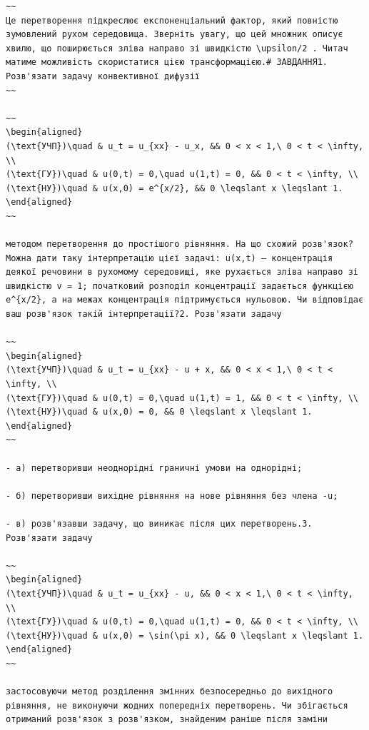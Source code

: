 \documentclass[
  ukrainian,
]{article}
\begin{document}
\begin{verbatim}
~~
Це перетворення підкреслює експоненціальний фактор, який повністю зумовлений рухом середовища. Зверніть увагу, що цей множник описує хвилю, що поширюється зліва направо зі швидкістю \upsilon/2 . Читач матиме можливість скористатися цією трансформацією.# ЗАВДАННЯ1. Розв'язати задачу конвективної дифузії
~~

~~
\begin{aligned}
(\text{УЧП})\quad & u_t = u_{xx} - u_x, && 0 < x < 1,\ 0 < t < \infty, \\
(\text{ГУ})\quad & u(0,t) = 0,\quad u(1,t) = 0, && 0 < t < \infty, \\
(\text{НУ})\quad & u(x,0) = e^{x/2}, && 0 \leqslant x \leqslant 1.
\end{aligned}
~~

методом перетворення до простішого рівняння. На що схожий розв'язок? Можна дати таку інтерпретацію цієї задачі: u(x,t) — концентрація деякої речовини в рухомому середовищі, яке рухається зліва направо зі швидкістю v = 1; початковий розподіл концентрації задається функцією e^{x/2}, а на межах концентрація підтримується нульовою. Чи відповідає ваш розв'язок такій інтерпретації?2. Розв'язати задачу

~~
\begin{aligned}
(\text{УЧП})\quad & u_t = u_{xx} - u + x, && 0 < x < 1,\ 0 < t < \infty, \\
(\text{ГУ})\quad & u(0,t) = 0,\quad u(1,t) = 1, && 0 < t < \infty, \\
(\text{НУ})\quad & u(x,0) = 0, && 0 \leqslant x \leqslant 1.
\end{aligned}
~~

- а) перетворивши неоднорідні граничні умови на однорідні;

- б) перетворивши вихідне рівняння на нове рівняння без члена -u;

- в) розв'язавши задачу, що виникає після цих перетворень.3. Розв'язати задачу

~~
\begin{aligned}
(\text{УЧП})\quad & u_t = u_{xx} - u, && 0 < x < 1,\ 0 < t < \infty, \\
(\text{ГУ})\quad & u(0,t) = 0,\quad u(1,t) = 0, && 0 < t < \infty, \\
(\text{НУ})\quad & u(x,0) = \sin(\pi x), && 0 \leqslant x \leqslant 1.
\end{aligned}
~~

застосовуючи метод розділення змінних безпосередньо до вихідного рівняння, не виконуючи жодних попередніх перетворень. Чи збігається отриманий розв'язок з розв'язком, знайденим раніше після заміни
\end{verbatim}
\end{document}
